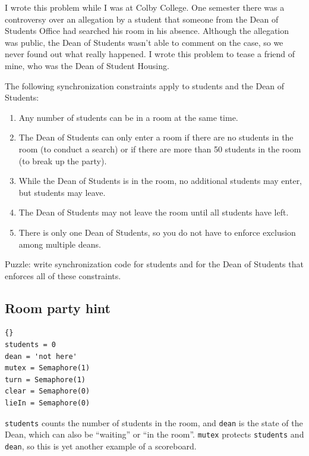 \documentclass{book}
\newcommand{\clearemptydoublepage}{\newpage\cleardoublepage}
\begin{document}
I wrote this problem while I was at Colby College.  One semester
there was a controversy over an allegation by a student that someone
from the Dean of Students Office had searched his room in his
absence.  Although the allegation was public, the Dean of Students
wasn't able to comment on the case, so we never found out what
really happened.  I wrote this problem to tease a friend of mine,
who was the Dean of Student Housing.

The following synchronization constraints apply to students
and the Dean of Students:

\begin{enumerate}

\item Any number of students can be in a room at the same
time.

\item The Dean of Students can only enter a room if there
are no students in the room (to conduct a search) or if
there are more than 50 students in the room (to break up
the party).

\item While the Dean of Students is in the room, no additional
students may enter, but students may leave.

\item The Dean of Students may not leave the room until all
students have left.

\item There is only one Dean of Students, so you do not have
to enforce exclusion among multiple deans.

\end{enumerate}

Puzzle: write synchronization code for students and for the
Dean of Students that enforces all of these constraints.


\clearemptydoublepage
\subsection {Room party hint}

\begin{latin}
\begin{lstlisting}[title={Room party hint}]{}
students = 0                
dean = 'not here'           
mutex = Semaphore(1)
turn = Semaphore(1)
clear = Semaphore(0)
lieIn = Semaphore(0)
\end{lstlisting}
\end{latin}

{\tt students} counts the number of students in the room,
and {\tt dean} is the state of the Dean, which can also be
``waiting'' or ``in the room''.
{\tt mutex} protects {\tt students} and {\tt dean}, so this
is yet another example of a scoreboard.
\end{document}

